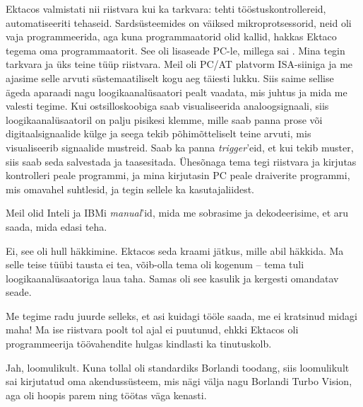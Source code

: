 Ektacos valmistati nii riistvara kui ka tarkvara: tehti 
tööstuskontrollereid, automatiseeriti tehaseid. Sardsüsteemides on väiksed mikroprotsessorid, neid oli vaja programmeerida, aga 
kuna programmaatorid olid kallid, hakkas Ektaco tegema oma 
programmaatorit. See oli lisaseade PC-le, millega sai
. Mina tegin tarkvara ja üks teine tüüp riistvara. Meil oli 
PC/AT platvorm ISA-siiniga ja me ajasime selle arvuti süstemaatiliselt kogu aeg 
täiesti lukku. Siis saime sellise ägeda aparaadi nagu
loogikaanalüsaatori pealt vaadata, mis juhtus ja mida me 
valesti tegime. Kui 
ostsilloskoobiga saab visualiseerida analoogsignaali, siis 
loogikaanalüsaatoril on palju pisikesi klemme, mille saab panna prose 
või digitaalsignaalide külge ja seega tekib põhimõtteliselt teine arvuti, mis  
visualiseerib signaalide mustreid. Saab ka panna 
\emph{trigger}'eid, et kui tekib muster, siis saab seda salvestada ja 
taasesitada. Ühesõnaga tema tegi riistvara ja kirjutas  
kontrolleri peale programmi, ja mina kirjutasin PC peale 
draiverite programmi, mis omavahel suhtlesid, ja tegin sellele ka 
kasutajaliidest.

Meil olid Inteli ja IBMi \emph{manual}'id, mida me 
sobrasime ja dekodeerisime, et aru saada, mida edasi teha. 



Ei, see oli hull häkkimine. Ektacos seda kraami jätkus, mille abil häkkida. Ma selle 
teise tüübi tausta ei tea, võib-olla tema oli kogenum – tema tuli 
loogikaanalüsaatoriga laua taha. Samas oli see 
kasulik ja kergesti omandatav seade. 


Me tegime radu juurde selleks, et asi kuidagi tööle saada, me ei 
kratsinud midagi maha! Ma ise riistvara poolt tol ajal ei puutunud, ehkki 
Ektacos oli programmeerija töövahendite hulgas kindlasti ka tinutuskolb. 



Jah, loomulikult. Kuna tollal oli standardiks Borlandi
toodang, siis loomulikult sai kirjutatud oma akendussüsteem, mis nägi välja nagu 
Borlandi Turbo Vision, aga oli hoopis parem ning töötas väga 
kenasti. 

